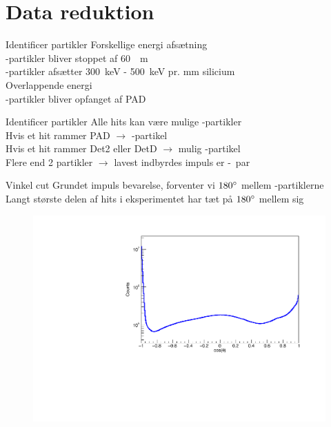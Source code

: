 \section{Data reduktion}

\begin{frame}{Identificer partikler}
	Forskellige energi afsætning\\
	\al-partikler bliver stoppet af \SI{60}{\mu m}\\
	\be-partikler afsætter \SI{300}{keV} - \SI{500}{keV} pr. mm silicium\\
	Overlappende energi\\
	\be-partikler bliver opfanget af PAD
\end{frame}

\begin{frame}{Identificer partikler}
	Alle hits kan være mulige \al-partikler\\ 
	Hvis et hit rammer PAD $\rightarrow$ \be-partikel\\
	Hvis et hit rammer Det2 eller DetD $\rightarrow$ mulig \be-partikel\\
	Flere end 2 partikler $\rightarrow$ lavest indbyrdes impuls er \al-\al\ par
\end{frame}

\begin{frame}{Vinkel cut}
	Grundet impuls bevarelse, forventer vi $180 \degree $ mellem \al-partiklerne\\
	Langt største delen af hits i eksperimentet har tæt på $180 \degree$ mellem sig
	\begin{figure}
		\centering
		\includegraphics[width=.7\columnwidth]{../figures/cosang.pdf}
	\end{figure}
\end{frame}


